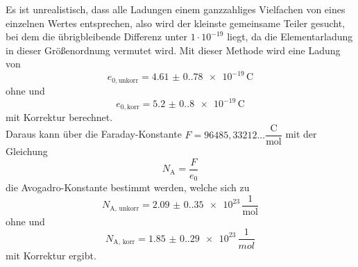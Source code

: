 Es ist unrealistisch, dass alle Ladungen einem ganzzahliges Vielfachen von eines einzelnen Wertes entsprechen, also wird der kleinste gemeinsame Teiler gesucht, bei dem die übrigbleibende Differenz unter $1 \cdot 10^{-19}$ liegt, da die Elementarladung in dieser Größenordnung vermutet wird.
Mit dieser Methode wird eine Ladung von
\begin{equation*}
  e_{0,\text{unkorr}} = \qty{4.61(0.78)e-19} \,\si{\coulomb}
\end{equation*} 
ohne und
\begin{equation*}
  e_{0,\text{korr}} = \qty{5.2(0.8)e-19} \,\unit{\coulomb}
\end{equation*}
mit Korrektur berechnet. \\

Daraus kann über die Faraday-Konstante $ F = 96485,33212... \dfrac{\unit{\coulomb}}{\text{mol}}$ \cite{go02} mit der Gleichung 
\begin{equation*}
  N_\text{A} = \dfrac{F}{e_0}
\end{equation*}
die Avogadro-Konstante bestimmt werden, welche 
sich zu
\begin{equation*}
  N_\text{A, unkorr} = \qty{2.09(0.35)e+23} \,\dfrac{1}{\si{\mol}}
\end{equation*}
ohne und
\begin{equation*}
  N_\text{A, korr} = \qty{1.85(0.29)e23} \, \dfrac{1}{\si{mol}}
\end{equation*}
mit Korrektur ergibt.